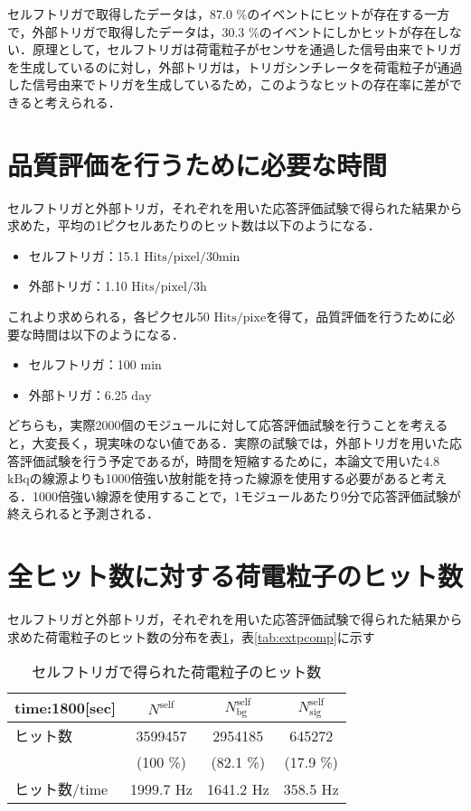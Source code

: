 セルフトリガで取得したデータは，87.0 \%のイベントにヒットが存在する一方で，外部トリガで取得したデータは，30.3 \%のイベントにしかヒットが存在しない．原理として，セルフトリガは荷電粒子がセンサを通過した信号由来でトリガを生成しているのに対し，外部トリガは，トリガシンチレータを荷電粒子が通過した信号由来でトリガを生成しているため，このようなヒットの存在率に差ができると考えられる．

\section{品質評価を行うために必要な時間}
\label{sec:conc2}
セルフトリガと外部トリガ，それぞれを用いた応答評価試験で得られた結果から求めた，平均の1ピクセルあたりのヒット数は以下のようになる．

\begin{itemize}
\item セルフトリガ：15.1 $\mathrm{Hits/pixel/30min}$
\item 外部トリガ：1.10 $\mathrm{Hits/pixel/3h}$
\end{itemize}

これより求められる，各ピクセル50 $\mathrm{Hits/pixe}$を得て，品質評価を行うために必要な時間は以下のようになる．
\begin{itemize}
\item セルフトリガ：100 $\mathrm{min}$
\item 外部トリガ：6.25 $\mathrm{day}$
\end{itemize}

どちらも，実際2000個のモジュールに対して応答評価試験を行うことを考えると，大変長く，現実味のない値である．実際の試験では，外部トリガを用いた応答評価試験を行う予定であるが，時間を短縮するために，本論文で用いた4.8 $\mathrm{kBq}$の線源よりも1000倍強い放射能を持った線源を使用する必要があると考える．1000倍強い線源を使用することで，1モジュールあたり9分で応答評価試験が終えられると予測される．

\section{全ヒット数に対する荷電粒子のヒット数}
\label{sec:conc3}
セルフトリガと外部トリガ，それぞれを用いた応答評価試験で得られた結果から求めた荷電粒子のヒット数の分布を表\ref{tab:selfpcomp}，表\ref{tab:extpcomp}に示す

\begin{table}[h]
  \centering
  \caption{セルフトリガで得られた荷電粒子のヒット数}
  \begin{tabular} {l|ccc} \hline
    time:1800[sec]& $N^{\mathrm{self}}$ & $N_{\mathrm{bg}}^{\mathrm{self}}$ & $N_{\mathrm{sig}}^{\mathrm{self}}$ \\ \hline \hline
    ヒット数 & 3599457 & 2954185 & 645272 \\
    & (100 \%) & (82.1 \%) & (17.9 \%) \\ \hline
    ヒット数/time & 1999.7 $\mathrm{Hz}$ & 1641.2 $\mathrm{Hz}$ & 358.5 $\mathrm{Hz}$ \\ \hline
  \end{tabular}
  \label{tab:selfpcomp}
\end{table}

